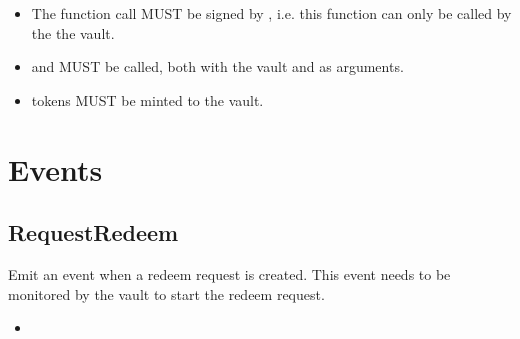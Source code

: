 \documentclass[a4paper,10pt,english]{sphinxmanual}
\begin{document}
\begin{itemize}
\item {} 
The function call MUST be signed by , i.e. this function can only be called by the the vault.

\item {} 
{\hyperref[\detokenize{spec/vault-registry:tryincreasetobeissuedtokens}]{}} and {\hyperref[\detokenize{spec/vault-registry:issuetokens}]{}} MUST be called, both with the vault and  as arguments.

\item {} 
 tokens MUST be minted to the vault.

\end{itemize}


\section{Events}
\label{\detokenize{spec/redeem:events}}

\subsection{RequestRedeem}
\label{\detokenize{spec/redeem:id14}}
Emit an event when a redeem request is created. This event needs to be monitored by the vault to start the redeem request.

\begin{itemize}
\item {} 

\end{itemize}
\end{document}
